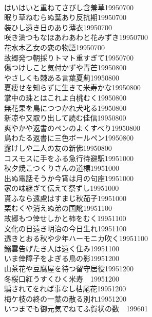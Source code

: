 \begin{multicols}{2}
\\はいはいと重ねてさびし含羞草\hfill{19950700}
\\眠り草ねむらぬ葉あり反抗期\hfill{19950700}
\\装ひし遠き日のあり薄衣\hfill{19950700}
\\咲き満つもなほあわあわと花みずき\hfill{19950700}
\\花水木乙女の恋の物語\hfill{19950700}
\\故郷発つ朝採りトマト重すぎて\hfill{19950700}
\\傷つけしこと気付かずや青芒\hfill{19950800}
\\やさしくも棘ある言葉夏薊\hfill{19950800}
\\夏痩せを知らずに生きて米寿かな\hfill{19950800}
\\掌中の珠とはこれよ白桃むく\hfill{19950800}
\\無花果を鳥につつかれ犬叱る\hfill{19950800}
\\新凉や又取り出して読む佳信\hfill{19950800}
\\爽やかや返書のペンのよくすべり\hfill{19950800}
\\鳥わたる返書に三色ボールペン\hfill{19950800}
\\露けしや二人の友の新佛\hfill{19950800}
\\コスモスに手をふる急行待避駅\hfill{19951000}
\\秋夕焼こつくりさんの道標\hfill{19951000}
\\出ぬ電話そうか今宵は月の句座\hfill{19951000}
\\家の味継ぎて伝えて祭ずし\hfill{19951000}
\\貰ふなら遠慮はすまじ秋茄子\hfill{19951000}
\\栗むくや消えぬ弟の国訛\hfill{19951100}
\\故郷もつ倖せしかと柿をむく\hfill{19951100}
\\文化の日遠き明治の今日生れ\hfill{19951100}
\\透きとおる秋や少年ハーモニカ吹く\hfill{19951100}
\\鰯雲告げたき人は遠く住み\hfill{19951100}
\\いま倖障子をよぎる鳥の影\hfill{19951200}
\\山茶花や豆腐屋を待つ留守居役\hfill{19951200}
\\冬桜口紅うすくひく米寿　\hfill{19951200}
\\騙されてをれば事なし枯尾花\hfill{19951200}
\\梅ケ枝の終の一葉の散る別れ\hfill{19951200}
\\いつまでも御元気でねてふ賀状の数　\hfill{199601}

\end{multicols}
